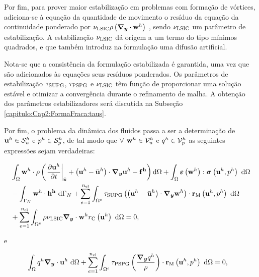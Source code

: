 \documentclass[tese_patricia]{subfiles}%
\begin{document}
Por fim, para prover maior estabilização em problemas com formação de vórtices, adiciona-se à equação da quantidade de movimento o resíduo da equação da continuidade ponderado por $ \nu_{\mathrm{LSIC}} \rho \left(\boldsymbol{\nabla_y} \cdot \mathbf{w}^h\right)$ \cite{TezduyarO:2000}, sendo $\nu_{\mathrm{LSIC}}$ um parâmetro de estabilização. A estabilização  $\nu_{\mathrm{LSIC}}$ dá origem a um termo do tipo mínimos quadrados, e que também introduz na formulação uma difusão artificial.

Nota-se que a consistência da formulação estabilizada é garantida, uma vez que são adicionados às equações seus resíduos ponderados. Os parâmetros de estabilização $\tau_{\mathrm{SUPG}}$, $\tau_{\mathrm{PSPG}}$ e $\nu_{\mathrm{LSIC}}$ têm função de proporcionar uma solução estável e otimizar a convergência durante o refinamento de malha. A obtenção dos parâmetros estabilizadores será discutida na Subseção \ref{capitulo:Cap2:FormaFraca:taus}. 

Por fim, o problema da dinâmica dos fluidos passa a ser a determinação de $\mathbf{u}^h \in \mathcal{S}_u^h$ e $p^h \in \mathcal{S}_p^h$, de tal modo que $\forall$ $\mathbf{w}^h \in \mathcal{V}_u^h$ e $q^h \in \mathcal{V}_p^h$ as seguintes expressões sejam verdadeiras:

\begin{align}
\begin{split}
&\int_{\Omega} \mathbf{w}^h \cdot \rho\left(\left. \frac{\partial\mathbf{u}^h}{\partial t}\right|_{\bar{\mathbf{x}}}+ \left(\mathbf{u}^h - \bar{\mathbf{u}}^h \right) \cdot \boldsymbol{\nabla_y} \mathbf{u}^h - \mathbf{f^h}\right) \mathrm{d} \Omega +\int_{\Omega} \bm{\varepsilon} \left(\mathbf{w}^h\right) : \boldsymbol{\sigma} \left(\mathbf{u}^h,p^h\right)\ \mathrm{d} \Omega\\ &
- \int_{\Gamma_{N}}\mathbf{w}^h \cdot \mathbf{h^h} \ \mathrm{d} \Gamma_{N} 
+ \sum_{e=1}^{n_{\mathrm{el}}} \int_{\Omega^e} \tau_{\mathrm{SUPG}} \left(\left(\mathbf{u}^h - \bar{\mathbf{u}}^h \right) \cdot \boldsymbol{\nabla_y} \mathbf{w}^h\right) \cdot \mathbf{r}_{\mathrm{M}}\left(\mathbf{u}^h,p^h \right)\  \mathrm{d} \Omega\\
&+ \sum_{e=1}^{n_{\mathrm{el}}} \int_{\Omega^e} \rho \nu_{\mathrm{LSIC}} \boldsymbol{\nabla_y} \cdot \mathbf{w}^h {r}_{\mathrm{C}}\left(\mathbf{u}^h\right)\  \mathrm{d} \Omega = 0,
\label{eq:QM_forma_fraca}
\end{split}
\end{align}

\noindent e

\begin{align}
	\begin{split}
	&\int_{\Omega}q^h \boldsymbol{\nabla_y} \cdot \mathbf{u}^h \ \mathrm{d} \Omega
	+ \sum_{e=1}^{n_{\mathrm{el}}} \int_{\Omega^e} \tau_{\mathrm{PSPG}} \left(\frac{\boldsymbol{\nabla_y} q^h}{\rho}\right) \cdot \mathbf{r}_{\mathrm{M}}\left(\mathbf{u}^h,p^h\right) \  \mathrm{d} \Omega = 0,
	\label{eq:C_forma_fraca}
	\end{split}
	\end{align}
\end{document}
